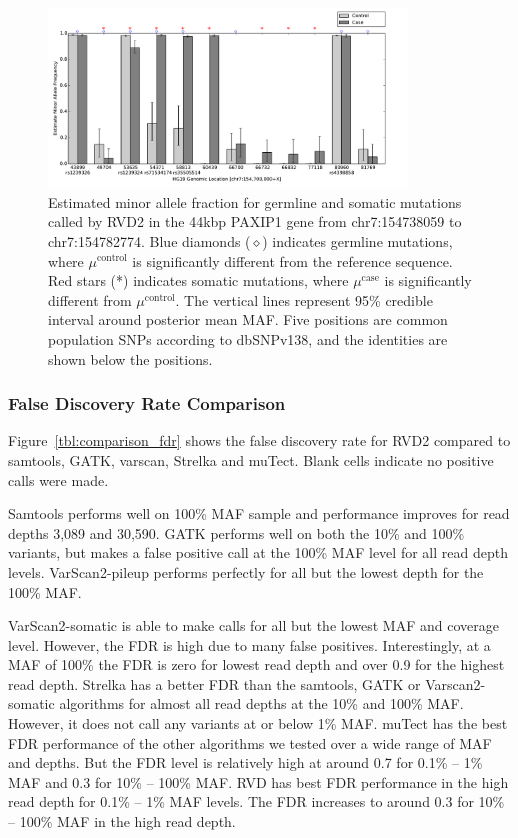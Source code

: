 \documentclass{bioinfo}
\begin{document}
\begin{figure}[!hbpt]
\begin{center}
\includegraphics[width=0.85\textwidth]{pdf_figs/HCC1187_MuBarPlot.pdf}
\caption{Estimated minor allele fraction for germline and somatic mutations called by RVD2 in the 44kbp PAXIP1 gene from chr7:154738059 to chr7:154782774. Blue diamonds ($\diamond$) indicates germline mutations, where $\mu^{\text{control}}$ is significantly different from the reference sequence. Red stars (*) indicates somatic mutations, where $\mu^{\text{case}}$ is significantly different from $ \mu^{\text{control}}$. The  vertical lines represent 95\% credible interval around posterior mean MAF. Five positions are common population SNPs according to dbSNPv138, and the identities are shown below the positions.}
\label{fig:brca_MAF}
\end{center}
\end{figure}


\subsubsection*{False Discovery Rate Comparison}

Figure~\ref{tbl:comparison_fdr} shows the false discovery rate for RVD2 compared to samtools, GATK, varscan, Strelka and muTect. Blank cells indicate no positive calls were made.

Samtools performs well on 100\% MAF sample and performance improves for read depths 3,089 and 30,590. GATK performs well on both the 10\% and 100\% variants, but makes a false positive call at the 100\% MAF level for all read depth levels. VarScan2-pileup performs perfectly for all but the lowest depth for the 100\% MAF.

VarScan2-somatic is able to make calls for all but the lowest MAF and coverage level. However, the FDR is high due to many false positives. Interestingly, at a MAF of 100\% the FDR is zero for lowest read depth and over 0.9 for the highest read depth. Strelka has a better FDR than the samtools, GATK or Varscan2-somatic algorithms for almost all read depths at the 10\% and 100\% MAF. However, it does not call any variants at or below 1\% MAF.  muTect has the best FDR performance of the other algorithms we tested over a wide range of MAF and depths. But the FDR level is relatively high at around 0.7 for 0.1\% -- 1\% MAF and 0.3 for 10\% -- 100\% MAF. RVD has best FDR performance in the high read depth for 0.1\% -- 1\% MAF levels. The FDR increases to around 0.3 for 10\% -- 100\% MAF in the high read depth.
\end{document}
